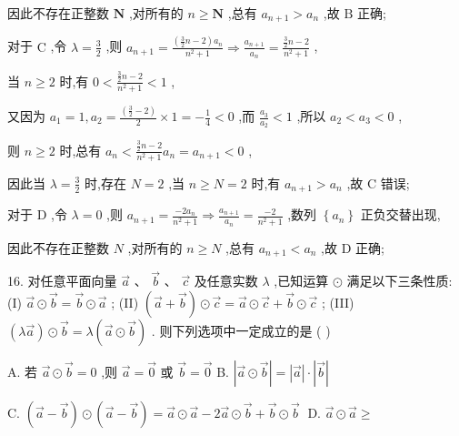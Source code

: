 \documentclass[10pt]{article}
\begin{document}
因此不存在正整数 \(\mathbf{N}\) ,对所有的 \(n \geq  \mathbf{N}\) ,总有 \({a}_{n + 1} > {a}_{n}\) ,故 \(\mathrm{B}\) 正确;

对于 \(\mathrm{C}\) ,令 \(\lambda  = \frac{3}{2}\) ,则 \({a}_{n + 1} = \frac{\left( {\frac{3}{2}n - 2}\right) {a}_{n}}{{n}^{2} + 1} \Rightarrow  \frac{{a}_{n + 1}}{{a}_{n}} = \frac{\frac{3}{2}n - 2}{{n}^{2} + 1}\) ,

当 \(n \geq  2\) 时,有 \(0 < \frac{\frac{3}{2}n - 2}{{n}^{2} + 1} < 1\) ,

又因为 \({a}_{1} = 1,{a}_{2} = \frac{\left( \frac{3}{2} - 2\right) }{2} \times  1 =  - \frac{1}{4} < 0\) ,而 \(\frac{{a}_{3}}{{a}_{2}} < 1\) ,所以 \({a}_{2} < {a}_{3} < 0\) ,

则 \(n \geq  2\) 时,总有 \({a}_{n} < \frac{\frac{3}{2}n - 2}{{n}^{2} + 1}{a}_{n} = {a}_{n + 1} < 0\) ,

因此当 \(\lambda  = \frac{3}{2}\) 时,存在 \(N = 2\) ,当 \(n \geq  N = 2\) 时,有 \({a}_{n + 1} > {a}_{n}\) ,故 \(\mathrm{C}\) 错误;

对于 \(\mathrm{D}\) ,令 \(\lambda  = 0\) ,则 \({a}_{n + 1} = \frac{-2{a}_{n}}{{n}^{2} + 1} \Rightarrow  \frac{{a}_{n + 1}}{{a}_{n}} = \frac{-2}{{n}^{2} + 1}\) ,数列 \(\left\{  {a}_{n}\right\}\) 正负交替出现,

因此不存在正整数 \(N\) ,对所有的 \(n \geq  N\) ,总有 \({a}_{n + 1} < {a}_{n}\) ,故 D 正确;

16. 对任意平面向量 \(\overrightarrow{a}\text{ 、 }\overrightarrow{b}\text{ 、 }\overrightarrow{c}\) 及任意实数 \(\lambda\) ,已知运算 \(\odot\) 满足以下三条性质: (I) \(\overrightarrow{a} \odot  \overrightarrow{b} = \overrightarrow{b} \odot  \overrightarrow{a}\) ; (II) \(\left( {\overrightarrow{a} + \overrightarrow{b}}\right)  \odot  \overrightarrow{c} = \overrightarrow{a} \odot  \overrightarrow{c} + \overrightarrow{b} \odot  \overrightarrow{c}\) ; (III) \(\left( {\lambda \overrightarrow{a}}\right)  \odot  \overrightarrow{b} = \lambda \left( {\overrightarrow{a} \odot  \overrightarrow{b}}\right)\) . 则下列选项中一定成立的是 ( )

A. 若 \(\overrightarrow{a} \odot  \overrightarrow{b} = 0\) ,则 \(\overrightarrow{a} = \overrightarrow{0}\) 或 \(\overrightarrow{b} = \overrightarrow{0}\) B. \(\left| {\overrightarrow{a} \odot  \overrightarrow{b}}\right|  = \left| \overrightarrow{a}\right|  \cdot  \left| \overrightarrow{b}\right|\)

C. \(\left( {\overrightarrow{a} - \overrightarrow{b}}\right)  \odot  \left( {\overrightarrow{a} - \overrightarrow{b}}\right)  = \overrightarrow{a} \odot  \overrightarrow{a} - 2\overrightarrow{a} \odot  \overrightarrow{b} + \overrightarrow{b} \odot  \overrightarrow{b}\;\) D. \(\overrightarrow{a} \odot  \overrightarrow{a} \geq\)
\end{document}
